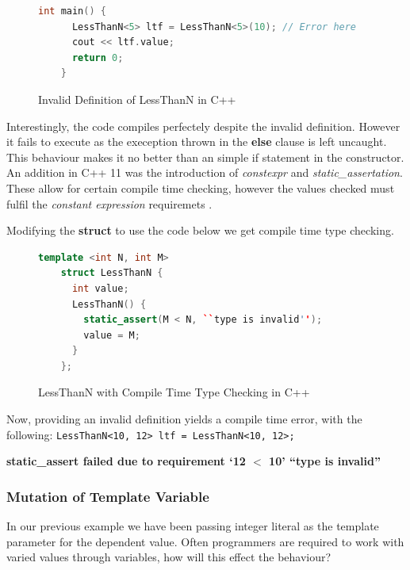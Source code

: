 \documentclass[a4paper,12pt]{report}
\begin{document}
\begin{figure}[H]
  \begin{lstlisting}[language=c++]     
    int main() {
      LessThanN<5> ltf = LessThanN<5>(10); // Error here
      cout << ltf.value; 
      return 0;
    }
  \end{lstlisting}
  \caption{Invalid Definition of LessThanN in C++}
\end{figure}

\par
Interestingly, the code compiles perfectely despite the invalid definition. 
However it fails to execute as the exeception thrown in the \textbf{else} clause 
is left uncaught. This behaviour makes it no better than an simple if statement 
in the constructor. An addition in C++ 11 was the introduction of 
\textit{constexpr} and \textit{static\_assertation}. These allow for certain 
compile time checking, however the values checked must fulfil 
the \textit{constant expression} requiremets \cite{cppConstExpr}. 

\par
Modifying the \textbf{struct} to use the code below we get compile time type 
checking. 

\begin{figure}[H]
  \begin{lstlisting}[language=c++]     
    template <int N, int M>
    struct LessThanN {
      int value;
      LessThanN() {
        static_assert(M < N, ``type is invalid'');
        value = M;
      }
    };
  \end{lstlisting}
  \caption{LessThanN with Compile Time Type Checking in C++}
  \label{code:compileLTN}
\end{figure}

\par
Now, providing an invalid definition yields a compile time error, with the 
following: 
\verb+LessThanN<10, 12> ltf = LessThanN<10, 12>;+ 

\textbf{static\_assert failed due to requirement `12 $<$ 10' ``type is invalid''}

\subsubsection{Mutation of Template Variable}
In our previous example we have been passing integer literal as the template 
parameter for the dependent value. Often programmers are required to 
work with varied values through variables, how will this effect the behaviour? 
\end{document}
